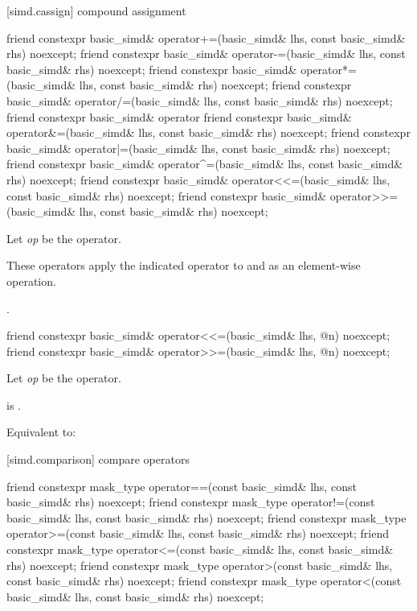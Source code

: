[simd.cassign]{ compound assignment}

\begin{itemdecl}
friend constexpr basic_simd& operator+=(basic_simd& lhs, const basic_simd& rhs) noexcept;
friend constexpr basic_simd& operator-=(basic_simd& lhs, const basic_simd& rhs) noexcept;
friend constexpr basic_simd& operator*=(basic_simd& lhs, const basic_simd& rhs) noexcept;
friend constexpr basic_simd& operator/=(basic_simd& lhs, const basic_simd& rhs) noexcept;
friend constexpr basic_simd& operator%
friend constexpr basic_simd& operator&=(basic_simd& lhs, const basic_simd& rhs) noexcept;
friend constexpr basic_simd& operator|=(basic_simd& lhs, const basic_simd& rhs) noexcept;
friend constexpr basic_simd& operator^=(basic_simd& lhs, const basic_simd& rhs) noexcept;
friend constexpr basic_simd& operator<<=(basic_simd& lhs, const basic_simd& rhs) noexcept;
friend constexpr basic_simd& operator>>=(basic_simd& lhs, const basic_simd& rhs) noexcept;
\end{itemdecl}

\begin{itemdescr}
  \pnum Let \textit{op} be the operator.

  \pnum\ConstraintOperatorTWellFormed

  \pnum\effects
  These operators apply the indicated operator to  and  as an element-wise
  operation.

  \pnum\returns
  .
\end{itemdescr}

\begin{itemdecl}
friend constexpr basic_simd& operator<<=(basic_simd& lhs, @\simdsizetype@ n) noexcept;
friend constexpr basic_simd& operator>>=(basic_simd& lhs, @\simdsizetype@ n) noexcept;
\end{itemdecl}

\begin{itemdescr}
  \pnum Let \textit{op} be the operator.

  \pnum\constraints
   is .

  \pnum\effects
  Equivalent to: 
\end{itemdescr}

[simd.comparison]{ compare operators}

\begin{itemdecl}
friend constexpr mask_type operator==(const basic_simd& lhs, const basic_simd& rhs) noexcept;
friend constexpr mask_type operator!=(const basic_simd& lhs, const basic_simd& rhs) noexcept;
friend constexpr mask_type operator>=(const basic_simd& lhs, const basic_simd& rhs) noexcept;
friend constexpr mask_type operator<=(const basic_simd& lhs, const basic_simd& rhs) noexcept;
friend constexpr mask_type operator>(const basic_simd& lhs, const basic_simd& rhs) noexcept;
friend constexpr mask_type operator<(const basic_simd& lhs, const basic_simd& rhs) noexcept;
\end{itemdecl}


